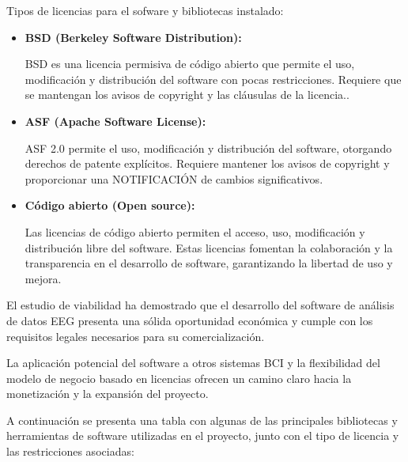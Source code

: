 Tipos de licencias para el sofware y bibliotecas instalado:

\begin{itemize}
 \tightlist
  \item
   \textbf{BSD (Berkeley Software Distribution):} 
    
    BSD es una licencia permisiva de código abierto que permite el uso, modificación y distribución del software con pocas restricciones. Requiere que se mantengan los avisos de copyright y las cláusulas de la licencia..
    
  \item
   \textbf{ASF (Apache Software License):}
    
    ASF 2.0 permite el uso, modificación y distribución del software, otorgando derechos de patente explícitos. Requiere mantener los avisos de copyright y proporcionar una NOTIFICACIÓN de cambios significativos.
    
  \item
   \textbf{Código abierto (Open source):}
    
    Las licencias de código abierto permiten el acceso, uso, modificación y distribución libre del software. Estas licencias fomentan la colaboración y la transparencia en el desarrollo de software, garantizando la libertad de uso y mejora.
\end{itemize}



El estudio de viabilidad ha demostrado que el desarrollo del software de análisis de datos EEG presenta una sólida oportunidad económica y cumple con los requisitos legales necesarios para su comercialización.

La aplicación potencial del software a otros sistemas BCI y la flexibilidad del modelo de negocio basado en licencias ofrecen un camino claro hacia la monetización y la expansión del proyecto.

  A continuación se presenta una tabla con algunas de las principales bibliotecas y herramientas de software utilizadas en el proyecto, junto con el tipo de licencia y las restricciones asociadas:
 

